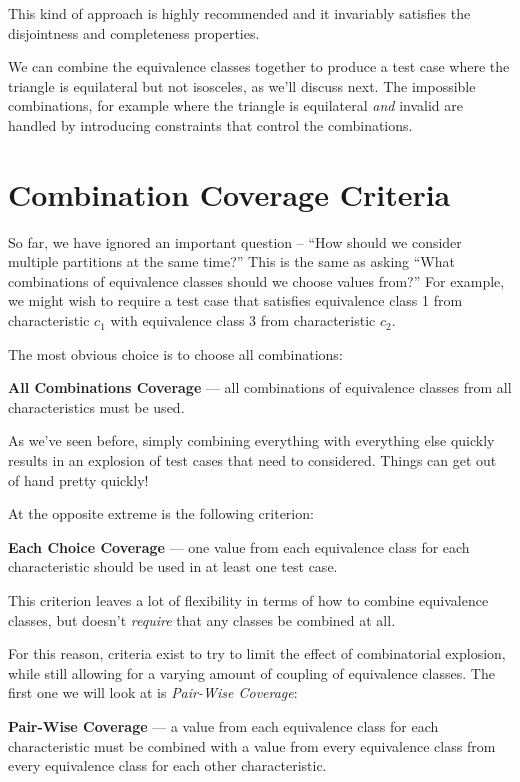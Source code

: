 This kind of approach is highly recommended and it invariably satisfies the
disjointness and completeness properties. 

We can combine the equivalence classes together to produce a test case where the
triangle is equilateral but not isosceles, as we'll discuss next. The impossible
combinations, for example where the triangle is equilateral {\it and} invalid
are handled by introducing constraints that control the combinations. 

\section{Combination Coverage Criteria}

So far, we have ignored an important question -- ``How should we consider
multiple partitions at the same time?'' This is the same as asking ``What
combinations of equivalence classes should we choose values from?'' For example,
we might wish to require a test case that satisfies equivalence class 1 from
characteristic $c_1$ with equivalence class 3 from characteristic $c_2$. 

The most obvious choice is to choose all combinations:

{\bf All Combinations Coverage} --- all combinations of equivalence classes from
all characteristics must be used. 

As we've seen before, simply combining everything with everything else quickly
results in an explosion of test cases that need to considered. Things can get
out of hand pretty quickly!

At the opposite extreme is the following criterion:

{\bf Each Choice Coverage} --- one value from each equivalence class for each
characteristic should be used in at least one test case. 

This criterion leaves a lot of flexibility in terms of how to combine
equivalence classes, but doesn't {\it require} that any classes be combined at
all. 

For this reason, criteria exist to try to limit the effect of combinatorial
explosion, while still allowing for a varying amount of coupling of equivalence
classes. The first one we will look at is {\it Pair-Wise Coverage}:

{\bf Pair-Wise Coverage} --- a value from each equivalence class for each
characteristic must be combined with a value from every equivalence class from
every equivalence class for each other characteristic.

